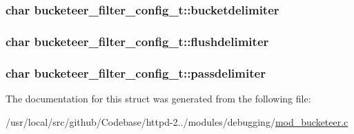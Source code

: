 \subsubsection[{\texorpdfstring{bucketdelimiter}{bucketdelimiter}}]{\setlength{\rightskip}{0pt plus 5cm}char bucketeer\+\_\+filter\+\_\+config\+\_\+t\+::bucketdelimiter}\hypertarget{structbucketeer__filter__config__t_a533532fb8758489797f5673695e5e73e}{}\label{structbucketeer__filter__config__t_a533532fb8758489797f5673695e5e73e}
\subsubsection[{\texorpdfstring{flushdelimiter}{flushdelimiter}}]{\setlength{\rightskip}{0pt plus 5cm}char bucketeer\+\_\+filter\+\_\+config\+\_\+t\+::flushdelimiter}\hypertarget{structbucketeer__filter__config__t_aae9075ef9d51e83171cfd8c064ff5659}{}\label{structbucketeer__filter__config__t_aae9075ef9d51e83171cfd8c064ff5659}
\subsubsection[{\texorpdfstring{passdelimiter}{passdelimiter}}]{\setlength{\rightskip}{0pt plus 5cm}char bucketeer\+\_\+filter\+\_\+config\+\_\+t\+::passdelimiter}\hypertarget{structbucketeer__filter__config__t_ab1a77ee8ccdb7fae0af7b771064038c9}{}\label{structbucketeer__filter__config__t_ab1a77ee8ccdb7fae0af7b771064038c9}


The documentation for this struct was generated from the following file\+:\begin{DoxyCompactItemize}
\item 
/usr/local/src/github/\+Codebase/httpd-\/2../modules/debugging/\hyperlink{mod__bucketeer_8c}{mod\+\_\+bucketeer.\+c}\end{DoxyCompactItemize}
